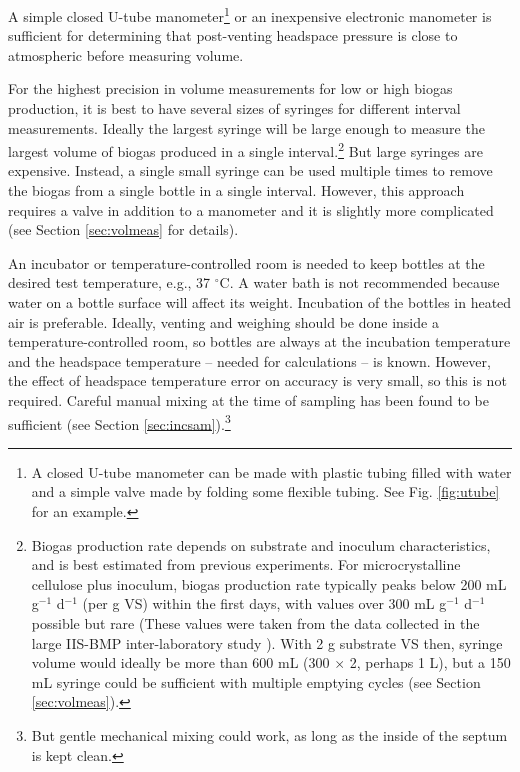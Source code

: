 \documentclass[]{article}
\begin{document}
A simple closed U-tube manometer\footnote{
  A closed U-tube manometer can be made with plastic tubing filled with water and a simple valve made by folding some flexible tubing. See Fig. \ref{fig:utube} for an example.  
} or an inexpensive electronic manometer is sufficient for determining that post-venting headspace pressure is close to atmospheric before measuring volume.

For the highest precision in volume measurements for low or high biogas production, it is best to have several sizes of syringes for different interval measurements.
Ideally the largest syringe will be large enough to measure the largest volume of biogas produced in a single interval.\footnote{
\label{fn:cellrate}
  Biogas production rate depends on substrate and inoculum characteristics, and is best estimated from previous experiments.
  For microcrystalline cellulose plus inoculum, biogas production rate typically peaks below 200 mL g$^{-1}$ d$^{-1}$ (per g VS) within the first days, with values over 300 mL g$^{-1}$ d$^{-1}$ possible but rare  
  (These values were taken from the data collected in the large IIS-BMP inter-laboratory study \citep{hafnerImprovingInterlaboratoryReproducibility2020}).
  With 2 g substrate VS then, syringe volume would ideally be more than 600 mL (300 $\times$ 2, perhaps 1 L), but a 150 mL syringe could be sufficient with multiple emptying cycles (see Section \ref{sec:volmeas}).
}
But large syringes are expensive.
Instead, a single small syringe can be used multiple times to remove the biogas from a single bottle in a single interval.
However, this approach requires a valve in addition to a manometer and it is slightly more complicated (see Section \ref{sec:volmeas} for details).

An incubator or temperature-controlled room is needed to keep bottles at the desired test temperature, e.g., 37 $^\circ$C.
A water bath is not recommended because water on a bottle surface will affect its weight.
Incubation of the bottles in heated air is preferable.
Ideally, venting and weighing should be done inside a temperature-controlled room, so bottles are always at the incubation temperature and the headspace temperature -- needed for calculations -- is known.
However, the effect of headspace temperature error on accuracy is very small, so this is not required.
Careful manual mixing at the time of sampling has been found to be sufficient (see Section \ref{sec:incsam}).\footnote{But gentle mechanical mixing could work, as long as the inside of the septum is kept clean.}
\end{document}
